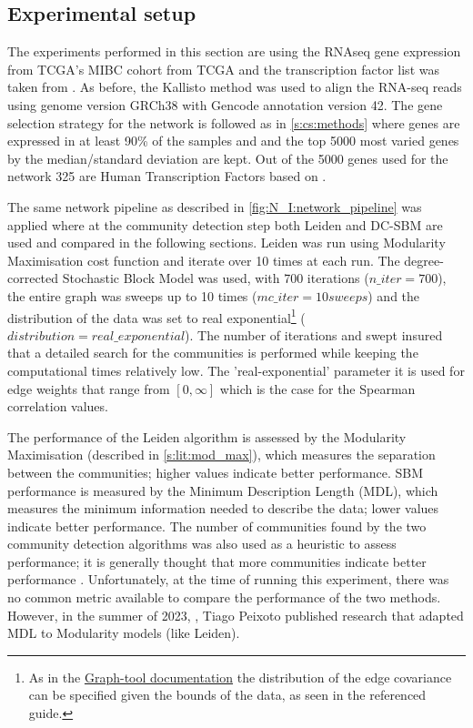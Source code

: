 \subsection{Experimental setup}


The experiments performed in this section are using the RNAseq gene expression from TCGA's MIBC cohort from TCGA and the transcription factor list was taken from \citet{Lambert2018-el}. As before, the Kallisto method was used to align the RNA-seq reads using genome version GRCh38 with Gencode annotation version 42. The gene selection strategy for the network is followed as in \cref{s:cs:methods} where genes are expressed in at least 90\% of the samples and and the top 5000 most varied genes by the median/standard deviation are kept. Out of the 5000 genes used for the network 325 are Human Transcription Factors based on \citet{Lambert2018-el}.

The same network pipeline as described in \cref{fig:N_I:network_pipeline} was applied where at the community detection step both Leiden and DC-SBM are used and compared in the following sections. Leiden was run using Modularity Maximisation cost function and iterate over 10 times at each run. The degree-corrected Stochastic Block Model was used, with 700 iterations ($n\_iter=700$), the entire graph was sweeps up to 10 times ($mc\_iter = 10 sweeps$) and the distribution of the data was set to real exponential\footnote{As in the \href{https://graph-tool.skewed.de/static/doc/demos/inference/inference.html}{Graph-tool documentation} the distribution of the edge covariance can be specified given the bounds of the data, as seen in the referenced guide.} ($distribution = real\_exponential$). The number of iterations and swept insured that a detailed search for the communities is performed while keeping the computational times relatively low. The 'real-exponential' parameter it is used for edge weights that range from $[0, \infty]$ which is the case for the Spearman correlation values.

The performance of the Leiden algorithm is assessed by the Modularity Maximisation (described in \cref{s:lit:mod_max}), which measures the separation between the communities; higher values indicate better performance. SBM performance is measured by the Minimum Description Length (MDL), which measures the minimum information needed to describe the data; lower values indicate better performance. The number of communities found by the two community detection algorithms was also used as a heuristic to assess performance; it is generally thought that more communities indicate better performance \citep{Care2019-ij}. Unfortunately, at the time of running this experiment, there was no common metric available to compare the performance of the two methods. However, in the summer of 2023, \cite{Peixoto2023-mw}, Tiago Peixoto published research that adapted MDL to Modularity models (like Leiden).

